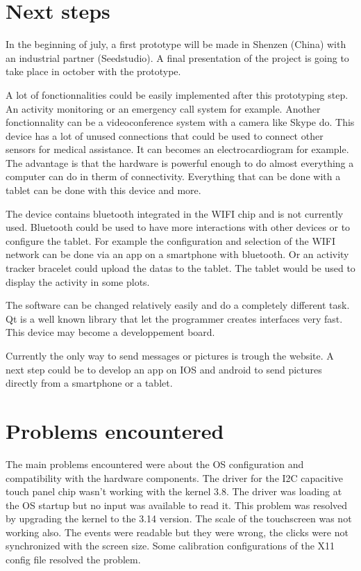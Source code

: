 \section{Next steps}
\label{chap: next steps}

In the beginning of july, a first prototype will be made in Shenzen (China) with an industrial partner (Seedstudio). A final presentation of the project is going to take place in october with the prototype.

A lot of fonctionnalities could be easily implemented after this prototyping step. An activity monitoring or an emergency call system for example. Another fonctionnality can be a videoconference system with a camera like Skype do. This device has a lot of unused connections that could be used to connect other sensors for medical assistance. It can becomes an electrocardiogram for example. The advantage is that the hardware is powerful enough to do almost everything a computer can do in therm of connectivity. Everything that can be done with a tablet can be done with this device and more.

The device contains bluetooth integrated in the WIFI chip and is not currently used. Bluetooth could be used to have more interactions with other devices or to configure the tablet. For example the configuration and selection of the WIFI network can be done via an app on a smartphone with bluetooth. Or an activity tracker bracelet could upload the datas to the tablet. The tablet would be used to display the activity in some plots.

The software can be changed relatively easily and do a completely different task. Qt is a well known library that let the programmer creates interfaces very fast. This device may become a developpement board.

Currently the only way to send messages or pictures is trough the website. A next step could be to develop an app on IOS and android to send pictures directly from a smartphone or a tablet.

\section{Problems encountered}

The main problems encountered were about the OS configuration and compatibility with the hardware components. The driver for the I2C capacitive touch panel chip wasn't working with the kernel 3.8. The driver was loading at the OS startup but no input was available to read it. This problem was resolved by upgrading the kernel to the 3.14 version. The scale of the touchscreen was not working also. The events were readable but they were wrong, the clicks were not synchronized with the screen size. Some calibration configurations of the X11 config file resolved the problem.
